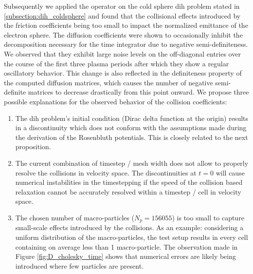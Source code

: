 Subsequently we applied the operator on the cold sphere \gls{dih} problem stated in
\ref{subsection:dih_coldsphere} and found that the collisional effects introduced by the friction
coefficients being too small to impact the normalized emittance of the electron sphere.
The diffusion coefficients were shown to occasionally inhibit the decomposition necessary for the
time integrator due to negative semi-definiteness.
We observed that they exhibit large noise levels on the off-diagonal entries
over the course of the first three plasma periods after which they show a regular oscillatory behavior.
This change is also reflected in the definiteness property of the computed diffusion matrices, which
causes the number of negative semi-definite matrices to decrease drastically from this point onward.
We propose three possible explanations for the observed behavior of the collision coefficients:
\begin{enumerate}
    \item The \gls{dih} problem's initial condition (Dirac delta function at the origin) results in a
        discontinuity which does not conform with the assumptions made during the derivation
        of the Rosenbluth potentials. This is closely related to the next proposition.
    \item The current combination of timestep / mesh width does not allow to properly resolve the
        collisions in velocity space.
        The discontinuities at $t=0$ will cause numerical instabilities in the timestepping
        if the speed of the collision based relaxation cannot be accurately resolved within a
        timestep / cell in velocity space.
    \item The chosen number of macro-particles ($N_p=156055$) is too small to capture small-scale
        effects introduced by the collisions. As an example: considering a uniform distribution of the
        macro-particles, the test setup results in every cell containing on average less than 1
        macro-particle. The observation made in Figure \ref{fig:D_cholesky_time} shows that
        numerical errors are likely being introduced where few particles are present.
\end{enumerate}
